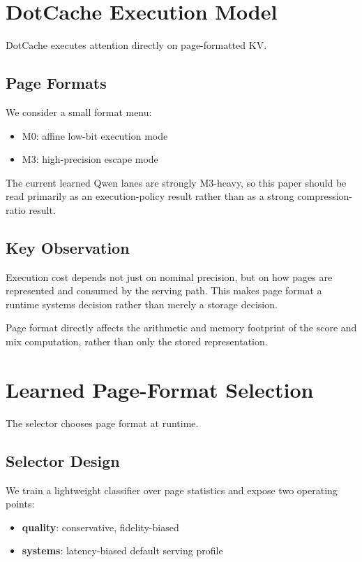 \documentclass[11pt]{article}
\begin{document}
\section{DotCache Execution Model}

DotCache executes attention directly on page-formatted KV.

\subsection{Page Formats}

We consider a small format menu:
\begin{itemize}[leftmargin=1.5em]
\item M0: affine low-bit execution mode
\item M3: high-precision escape mode
\end{itemize}

The current learned Qwen lanes are strongly M3-heavy, so this paper should be read primarily as an execution-policy result rather than as a strong compression-ratio result.

\subsection{Key Observation}

Execution cost depends not just on nominal precision, but on how pages are represented and consumed by the serving path. This makes page format a runtime systems decision rather than merely a storage decision.

Page format directly affects the arithmetic and memory footprint of the score and mix computation, rather than only the stored representation.

\FloatBarrier

\section{Learned Page-Format Selection}

The selector chooses page format at runtime.

\subsection{Selector Design}

We train a lightweight classifier over page statistics and expose two operating points:
\begin{itemize}[leftmargin=1.5em]
\item \textbf{quality}: conservative, fidelity-biased
\item \textbf{systems}: latency-biased default serving profile
\end{itemize}
\end{document}
